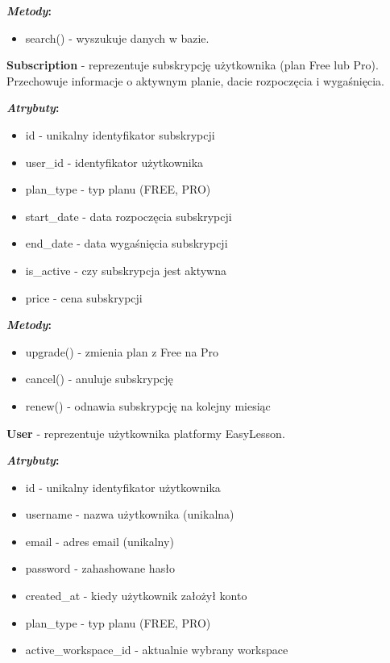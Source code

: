 \documentclass[12pt,a4paper]{article}
\begin{document}
\textbf{\textit{Metody}:}
\begin{itemize}[leftmargin=*]
    \item search() - wyszukuje danych w bazie.
\end{itemize}

\vspace{1em}

\textbf{Subscription} - reprezentuje subskrypcję użytkownika (plan Free lub Pro). Przechowuje informacje o aktywnym planie, dacie rozpoczęcia i wygaśnięcia.

\textbf{\textit{Atrybuty}:}
\begin{itemize}[leftmargin=*]
    \item id - unikalny identyfikator subskrypcji
    \item user\_id - identyfikator użytkownika
    \item plan\_type - typ planu (FREE, PRO)
    \item start\_date - data rozpoczęcia subskrypcji
    \item end\_date - data wygaśnięcia subskrypcji
    \item is\_active - czy subskrypcja jest aktywna
    \item price - cena subskrypcji
\end{itemize}

\textbf{\textit{Metody}:}
\begin{itemize}[leftmargin=*]
    \item upgrade() - zmienia plan z Free na Pro
    \item cancel() - anuluje subskrypcję
    \item renew() - odnawia subskrypcję na kolejny miesiąc
\end{itemize}

\vspace{1em}

\textbf{User} - reprezentuje użytkownika platformy EasyLesson.

\textbf{\textit{Atrybuty}:}
\begin{itemize}[leftmargin=*]
    \item id - unikalny identyfikator użytkownika
    \item username - nazwa użytkownika (unikalna)
    \item email - adres email (unikalny)
    \item password - zahashowane hasło
    \item created\_at - kiedy użytkownik założył konto
    \item plan\_type - typ planu (FREE, PRO)
    \item active\_workspace\_id - aktualnie wybrany workspace
\end{itemize}
\end{document}
